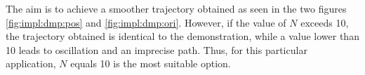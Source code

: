 The aim is to achieve a smoother trajectory obtained as seen in the two figures \ref{fig:impl:dmp:pos} and \ref{fig:impl:dmp:ori}. 
However, if the value of $N$ exceeds 10, the trajectory obtained is identical to the demonstration, while a value lower than 10 leads to oscillation and an imprecise path. Thus, for this particular application, $N$ equals 10 is the most suitable option.
